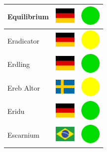 \documentclass[12pt, a4paper, twoside]{report}
\begin{document}
\begin{center}
\begin{longtable}{|p{5cm}|p{2cm}|p{2cm}|}
 Equilibrium                                                & \includegraphics[width=1cm]{../4x3/de} &   \includegraphics[width=1cm]{../likes/y} \\ \hline
 Eradicator                                                 & \includegraphics[width=1cm]{../4x3/de} &   \includegraphics[width=1cm]{../likes/m} \\ \hline
 Erdling                                                    & \includegraphics[width=1cm]{../4x3/de} &   \includegraphics[width=1cm]{../likes/y} \\ \hline
 Ereb Altor                                                 & \includegraphics[width=1cm]{../4x3/se} &   \includegraphics[width=1cm]{../likes/m} \\ \hline
 Eridu                                                      & \includegraphics[width=1cm]{../4x3/de} &   \includegraphics[width=1cm]{../likes/y} \\ \hline
 Escarnium                                                  & \includegraphics[width=1cm]{../4x3/br} &   \includegraphics[width=1cm]{../likes/y} \\ \hline

\end{longtable}
\end{center}
\end{document}
